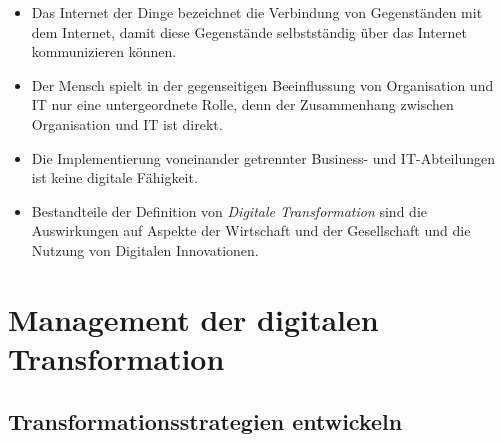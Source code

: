 \documentclass[12pt,a4paper]{article}
\begin{document}
\begin{itemize}
   \item Das Internet der Dinge bezeichnet die Verbindung von Gegenständen mit dem Internet, damit diese Gegenstände selbstständig über das Internet kommunizieren können.
   
   \item Der Mensch spielt in der gegenseitigen Beeinflussung von Organisation und IT nur eine untergeordnete Rolle, denn der Zusammenhang zwischen Organisation und IT ist direkt.
   
   \item Die Implementierung voneinander getrennter Business- und IT-Abteilungen ist keine digitale Fähigkeit.
   
   \item Bestandteile der Definition von \emph{Digitale Transformation} sind die Auswirkungen auf Aspekte der Wirtschaft und der Gesellschaft und die Nutzung von Digitalen Innovationen.
\end{itemize}


\newpage
\section{Management der digitalen Transformation}

\vspace*{0.5cm}
\subsection{Transformationsstrategien entwickeln} %
\end{document}
